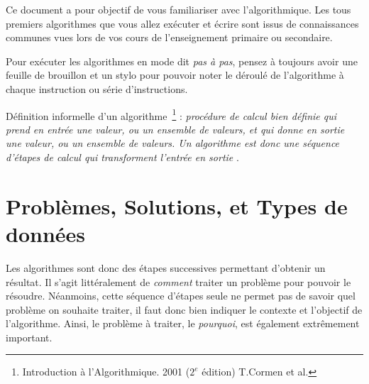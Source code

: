 \documentclass[11pt,a4paper]{article}
\begin{document}
\EncadreTitre

\bigskip


%
%

\bigskip


Ce document a pour objectif de vous familiariser avec l'algorithmique.
Les tous premiers algorithmes que vous allez exécuter et écrire sont issus de connaissances communes vues lors de vos cours de l'enseignement primaire ou secondaire.

Pour exécuter les algorithmes en mode dit \textit{pas à pas}, pensez à toujours avoir une feuille de brouillon et un stylo pour pouvoir noter le déroulé de l'algorithme à chaque instruction ou série d'instructions.

\bigskip

Définition informelle d'un algorithme~\footnote{Introduction à l'Algorithmique. 2001 ($2^{e}$ édition) T.Cormen et al.} : \og \textit{procédure de calcul bien définie qui prend en entrée une valeur, ou un ensemble de valeurs, et qui donne en sortie une valeur, ou un ensemble de valeurs. Un algorithme est donc une séquence d'étapes de calcul qui transforment l'entrée en sortie} \fg .

\bigskip


\section{Problèmes, Solutions, et Types de données}

\bigskip

Les algorithmes sont donc des étapes successives permettant d'obtenir un résultat.
Il s'agit littéralement de \textit{comment} traiter un problème pour pouvoir le résoudre.
Néanmoins, cette séquence d'étapes seule ne permet pas de savoir quel problème on souhaite traiter, il faut donc bien indiquer le contexte et l'objectif de l'algorithme.
Ainsi, le problème à traiter, le \textit{pourquoi}, est également extrêmement important.
\end{document}
